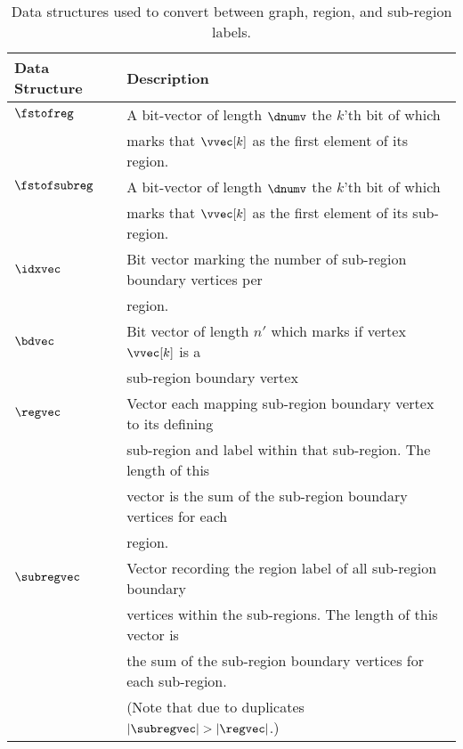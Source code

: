 \begin{table*}[ht]
\centering
\begin{tabular}{l | l}
  Data Structure & Description \\ \hline
  $\fstofreg$ & A bit-vector of length $\dnumv$ the $k$'th bit of which \\
              & marks that $\vvec[k]$ as the first element of its region. \\
  $\fstofsubreg$ & A bit-vector of length $\dnumv$ the $k$'th bit of which \\
              & marks that $\vvec[k]$ as the first element of its sub-region. \\
  $\idxvec$ & Bit vector marking the number of sub-region boundary vertices per \\
              & region. \\
  $\bdvec$ & Bit vector of length $n'$ which marks if vertex $\vvec[k]$ is a \\
              & sub-region boundary vertex \\
  $\regvec$ & Vector each mapping sub-region boundary vertex to its defining \\
              & sub-region and label within that sub-region. The length of this\\
			  & vector is the sum of the sub-region boundary vertices for each \\
			  & region. \\
  $\subregvec$ & Vector recording the region label of all sub-region boundary \\
			  & vertices within the sub-regions. The length of this vector is \\
			  & the sum of the sub-region boundary vertices for each sub-region. \\
			  & (Note that due to duplicates $|\subregvec| > |\regvec|$.) \\ \hline
\end{tabular}
\caption{Data structures used to convert between graph, region, and sub-region labels.}
\label{tab:ds_label_conv}
\end{table*}


